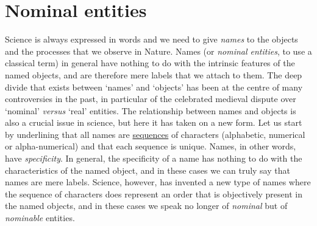 \documentclass[12pt]{article}
\begin{document}
\section{Nominal entities}
Science is always expressed in words and we need to give \textit{names} to the objects and the processes that we observe in Nature. Names (or \textit{nominal entities}, to use a classical term) in general have nothing to do with the intrinsic features of the named objects, and are therefore mere labels that we attach to them. The deep divide that exists between `names' and `objects' has been at the centre of many controversies in the past, in particular of the celebrated medieval dispute over `nominal' \textit{versus} `real' entities. The relationship between names and objects is also a crucial issue in science, but here it has taken on a new form. Let us start by underlining that all names are \hyperlink{sequences}{sequences} of characters (alphabetic, numerical or alpha-numerical) and that each sequence is unique. Names, in other words, have \textit{specificity}. In general, the specificity of a name has nothing to do with the characteristics of the named object, and in these cases we can truly say that names are mere labels. Science, however, has invented a new type of names where the sequence of characters does represent an order that is objectively present in the named objects, and in these cases we speak no longer of \textit{nominal} but of \textit{nominable} entities. 

\hypertarget{nominable_entity}{}
\end{document}
